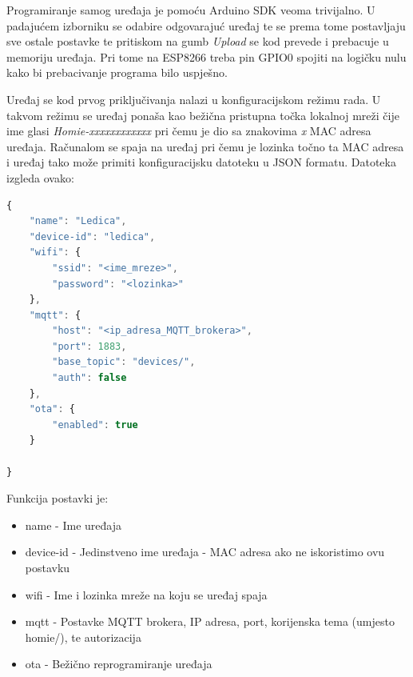 \documentclass[times, utf8, zavrsni]{fer}
\begin{document}
Programiranje samog uređaja je pomoću Arduino SDK veoma trivijalno.
U padajućem izborniku se odabire odgovarajuć uređaj te se prema tome postavljaju sve ostale postavke te pritiskom na gumb \textit{Upload} se kod prevede i prebacuje u memoriju uređaja.
Pri tome na ESP8266 treba pin GPIO0 spojiti na logičku nulu kako bi prebacivanje programa bilo uspješno.

Uređaj se kod prvog priključivanja nalazi u konfiguracijskom režimu rada.
U takvom režimu se uređaj ponaša kao bežična pristupna točka lokalnoj mreži čije ime glasi \textit{Homie-xxxxxxxxxxxx} pri čemu je dio sa znakovima \textit{x} MAC adresa uređaja.
Računalom se spaja na uređaj pri čemu je lozinka točno ta MAC adresa i uređaj tako može primiti konfiguracijsku datoteku u JSON formatu.
Datoteka izgleda ovako:
\begin{lstlisting}[language=JavaScript]
{
    "name": "Ledica",
    "device-id": "ledica",
    "wifi": {
        "ssid": "<ime_mreze>",
        "password": "<lozinka>"
    },
    "mqtt": {
        "host": "<ip_adresa_MQTT_brokera>",
        "port": 1883,
        "base_topic": "devices/",
        "auth": false
    },
    "ota": {
        "enabled": true
    }

}
\end{lstlisting}
Funkcija postavki je:
\begin{itemize}
    \item name - Ime uređaja
    \item device-id - Jedinstveno ime uređaja - MAC adresa ako ne iskoristimo ovu postavku
    \item wifi - Ime i lozinka mreže na koju se uređaj spaja
    \item mqtt - Postavke MQTT brokera, IP adresa, port, korijenska tema (umjesto homie/), te autorizacija
    \item ota - Bežično reprogramiranje uređaja
\end{itemize}
\end{document}
